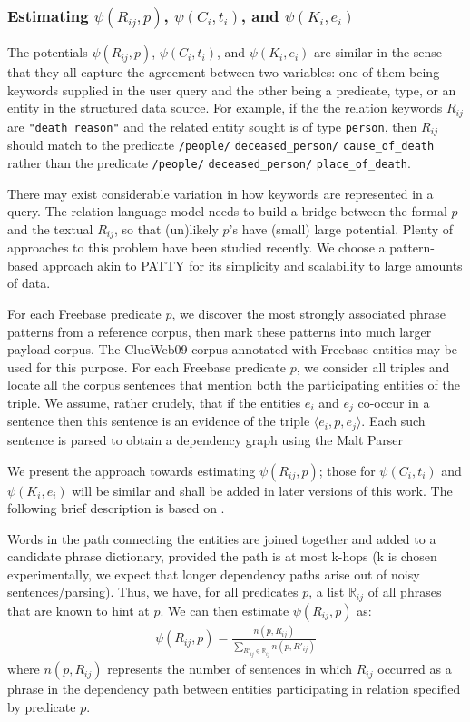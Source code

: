 \documentclass[a4paper, twoside, 12pt]{report}
\begin{document}
\subsubsection{Estimating $\psi(R_{ij}, p)$, $\psi(C_i, t_i)$, and $\psi(K_i, e_i)$}
The  potentials $\psi(R_{ij}, p)$, $\psi(C_i, t_i)$, and $\psi(K_i, e_i)$ are similar in the sense that they all capture the agreement between two variables: one of them being keywords supplied in the user query and the other being a predicate, type, or an entity in the structured data source.
For example, if the the relation keywords $R_{ij}$ are \texttt{"death reason"} and the related entity sought is of type \texttt{person}, then $R_{ij}$ should match to the predicate \texttt{/people/} \texttt{deceased\_person/} \texttt{cause\_of\_death} rather than the predicate \texttt{/people/} \texttt{deceased\_person/} \texttt{place\_of\_death}.

There may exist considerable variation in how keywords are represented in a query. The relation language model needs to build a bridge between the formal $p$ and the textual $R_{ij}$, so that (un)likely $p$'s have (small) large potential. Plenty of approaches \cite{berant2013semantic, berant2014semantic, kwiatkowski2013scaling, yih2014semantic} to this problem have been studied recently. We choose a pattern-based approach akin to PATTY \cite{nakashole2012patty} for its simplicity and scalability to large amounts of data.

For each Freebase predicate $p$, we discover the most strongly associated phrase patterns from a reference corpus, then mark these patterns into much larger payload corpus.
The ClueWeb09 corpus annotated with Freebase entities \cite{gabrilovich2013facc1} may be used for this purpose. For each Freebase predicate $p$, we consider all triples and locate all the corpus sentences that mention both the participating entities of the triple. We assume, rather crudely, that if the entities $e_i$ and $e_j$ co-occur in a sentence then this sentence is an evidence of the triple $\langle e_i, p, e_j \rangle$. Each such sentence is parsed to obtain a dependency graph using the Malt Parser \cite{nivre2007maltparser}

We present the approach towards estimating $\psi(R_{ij}, p)$; those for $\psi(C_i, t_i)$ and $\psi(K_i, e_i)$ will be similar and shall be added in later versions of this work. The following brief description is based on \cite{joshiknowledge}.

Words in the path connecting the entities are joined together and added to a candidate phrase dictionary, provided the path is at most k-hops (k is chosen experimentally, we expect that longer dependency paths arise out of noisy sentences/parsing). Thus, we have, for all predicates $p$, a list $\mathbb{R}_{ij}$ of all phrases that are known to hint at $p$. We can then estimate $\psi(R_{ij}, p)$ as:
\begin{align}
\psi(R_{ij}, p) = \frac{n(p, R_{ij})}{\sum_{R'_{ij} \in \mathbb{R}_{ij}}{n(p, R'_{ij})}}
\end{align}
 where $n(p, R_{ij})$ represents the number of sentences in which $R_{ij}$ occurred as a phrase in the dependency path between entities participating in relation specified by predicate $p$.
\end{document}
